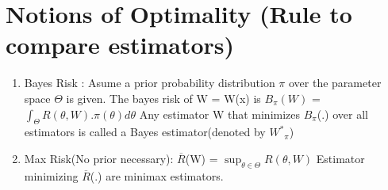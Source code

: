 \documentclass[a4paper,english,12pt]{article}
\begin{document}
\section{Notions of Optimality (Rule to compare estimators)}
\begin{enumerate} 
	\item Bayes Risk :
	\newline \hspace*{1cm} Asume a prior probability distribution $\pi$ over the parameter space $\Theta$ is given.
	\newline The bayes risk of W = W(x) is 
	\newline \hspace*{2cm} $B_\pi(W)$ = $\int_{\Theta}^{}R(\theta,W).\pi(\theta)d\theta$
	\newline Any estimator W that minimizes $B_\pi$(.) over all estimators is called a Bayes estimator(denoted by ${W^*}_\pi$) 
	\item Max Risk(No prior necessary): 
	\newline\hspace*{2cm} $\overline{R}$(W) = $\sup_{\theta\in\Theta} R(\theta,W)$
	\newline Estimator minimizing $\overline{R}$(.) are minimax estimators.
\end{enumerate}
\end{document}
